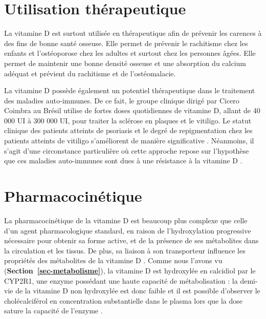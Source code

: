 \documentclass[
  a4paper,
  DIV=11,
  numbers=noendperiod,
  listof=totoc]{scrreprt}
\begin{document}
\section{Utilisation thérapeutique}\label{utilisation-thuxe9rapeutique}

La vitamine D est surtout utilisée en thérapeutique afin de prévenir les
carences à des fins de bonne santé osseuse. Elle permet de prévenir le
rachitisme chez les enfants et l'ostéoporose chez les adultes et surtout
chez les personnes âgées. Elle permet de maintenir une bonne densité
osseuse et une absorption du calcium adéquat et prévient du rachitisme
et de l'ostéomalacie.

La vitamine D possède également un potentiel thérapeutique dans le
traitement des maladies auto-immunes. De ce fait, le groupe clinique
dirigé par Cicero Coimbra au Brésil utilise de fortes doses quotidiennes
de vitamine D, allant de 40 000 UI à 300 000 UI, pour traiter la
sclérose en plaques et le vitiligo. Le statut clinique des patients
atteints de psoriasis et le degré de repigmentation chez les patients
atteints de vitiligo s'améliorent de manière significative
\autocite{Amon.2022}. Néanmoins, il s'agit d'une circonstance
particulière où cette approche repose sur l'hypothèse que ces maladies
auto-immunes sont dues à une résistance à la vitamine D
\autocite{Lemke.2021}.

\section{Pharmacocinétique}\label{pharmacocinuxe9tique}

La pharmacocinétique de la vitamine D est beaucoup plus complexe que
celle d'un agent pharmacologique standard, en raison de l'hydroxylation
progressive nécessaire pour obtenir sa forme active, et de la présence
de ses métabolites dans la circulation et les tissus. De plus, sa
liaison à son transporteur  influence les propriétés des
métabolites de la vitamine D \autocite{Schoenmakers.2018}. Comme nous
l'avons vu (\textbf{Section~\ref{sec-metabolisme}}), la vitamine D est
hydroxylée en calcidiol par le CYP2R1, une enzyme possédant une haute
capacité de métabolisation : la demi-vie de la vitamine D non hydroxylée
est donc faible et il est possible d'observer le cholécalciférol en
concentration substantielle dans le plasma lors que la dose sature la
capacité de l'enzyme \autocite{Schoenmakers.2018}.
\end{document}
